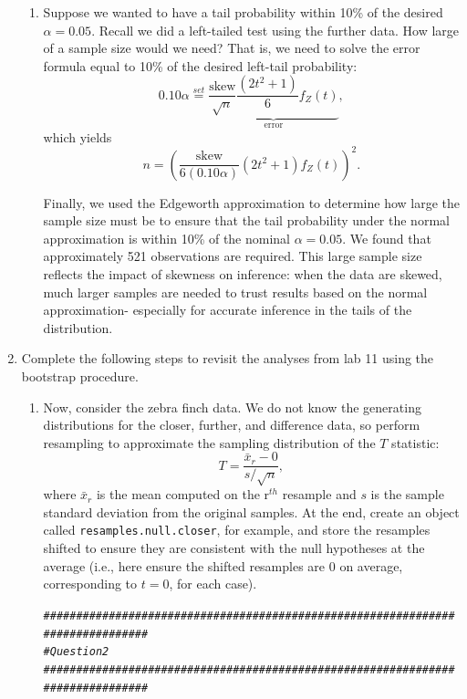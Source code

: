 \documentclass{article}\usepackage[]{graphicx}\usepackage[]{xcolor}
\makeatletter
\newcommand{\hlcom}[1]{\textcolor[rgb]{0.678,0.584,0.686}{\textit{#1}}}%
\newenvironment{kframe}{%
 \def\at@end@of@kframe{}%
 \ifinner\ifhmode%
  \def\at@end@of@kframe{\end{minipage}}%
  \begin{minipage}{\columnwidth}%
 \fi\fi%
 \def\FrameCommand##1{\hskip\@totalleftmargin \hskip-\fboxsep
 \colorbox{shadecolor}{##1}\hskip-\fboxsep
     \hskip-\linewidth \hskip-\@totalleftmargin \hskip\columnwidth}%
 \MakeFramed {\advance\hsize-\width
   \@totalleftmargin\z@ \linewidth\hsize
   \@setminipage}}%
 {\par\unskip\endMakeFramed%
 \at@end@of@kframe}
\newenvironment{knitrout}{}{} %
\makeatother
\begin{document}
\begin{enumerate}
\begin{enumerate}
  \item Suppose we wanted to have a tail probability within 10\% of the desired
  $\alpha=0.05$. Recall we did a left-tailed test using the further data.
  How large of a sample size would we need? That is, we need
  to solve the error formula equal to 10\% of the desired left-tail probability:
  \[0.10 \alpha  \stackrel{set}{=} \underbrace{\frac{\text{skew}}{\sqrt{n}} \frac{(2t^2+1)}{6} f_Z(t)}_{\textrm{error}},\]
  which yields
  \[ n = \left(\frac{\text{skew}}{6(0.10\alpha)} (2t^2 + 1) f_Z(t)\right)^2.\]
  
Finally, we used the Edgeworth approximation to determine how large the sample
size must be to ensure that the tail probability under the normal approximation
is within 10\% of the nominal $\alpha = 0.05$. We found that approximately
521 observations are required. This large sample size reflects the impact of 
skewness on inference: when the data are skewed, much larger samples are needed
to trust results based on the normal approximation- especially for accurate inference
in the tails of the distribution.
  
\end{enumerate}
\item Complete the following steps to revisit the analyses from lab 11 using the
bootstrap procedure.
\begin{enumerate}
\item Now, consider the zebra finch data. We do not know the generating distributions
for the closer, further, and difference data, so perform resampling to approximate the 
sampling distribution of the $T$ statistic:
  \[T = \frac{\bar{x}_r - 0}{s/\sqrt{n}},\]
  where $\bar{x}_r$ is the mean computed on the r$^{th}$ resample and $s$ is the
  sample standard deviation from the original samples. At the end, create an
  object called \texttt{resamples.null.closer}, for example, and store the 
  resamples shifted to ensure they are consistent with the null hypotheses at the average 
  (i.e., here ensure the shifted resamples are 0 on average, corresponding
  to $t=0$, for each case). 

\begin{knitrout}\scriptsize
{}\color{fgcolor}\begin{kframe}
\begin{alltt}
\hlcom{###############################################################################}
\hlcom{# Question 2}
\hlcom{###############################################################################}


\end{alltt}
\end{kframe}
\end{knitrout}
\end{enumerate}
\end{enumerate}
\end{document}
